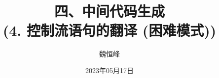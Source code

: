 \documentclass[]{beamer}
\title[中间代码生成]{四、中间代码生成 \\ (4. 控制流语句的翻译 (困难模式))}
\author[魏恒峰]{\large 魏恒峰}
\institute{hfwei@nju.edu.cn}
\date{2023年05月17日}
\begin{document}
\maketitle




\thankyou{}

\end{document}
